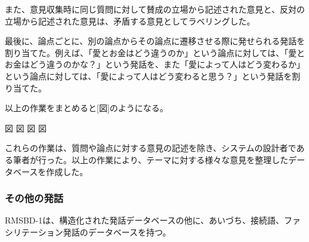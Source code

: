 \documentclass[11pt, a4paper]{jreport} %
\begin{document}
\begin{enumerate}
また、意見収集時に同じ質問に対して賛成の立場から記述された意見と、反対の立場から記述された意見は、矛盾する意見としてラベリングした。%


最後に、論点ごとに、別の論点からその論点に遷移させる際に発せられる発話を割り当てた。例えば、「愛とお金はどう違うのか」という論点に対しては、「愛とお金はどう違うのかな？」という発話を、また「愛によって人はどう変わるか」という論点に対しては、「愛によって人はどう変わると思う？」という発話を割り当てた。


以上の作業をまとめると[図]のようになる。

図
図
図
図


これらの作業は、質問や論点に対する意見の記述を除き、システムの設計者である筆者が行った。以上の作業により、テーマに対する様々な意見を整理したデータベースを作成した。
\end{enumerate}
\subsubsection*{その他の発話}
RMSBD-1は、構造化された発話データベースの他に、あいづち、接続語、ファシリテーション発話のデータベースを持つ。
\end{document}
